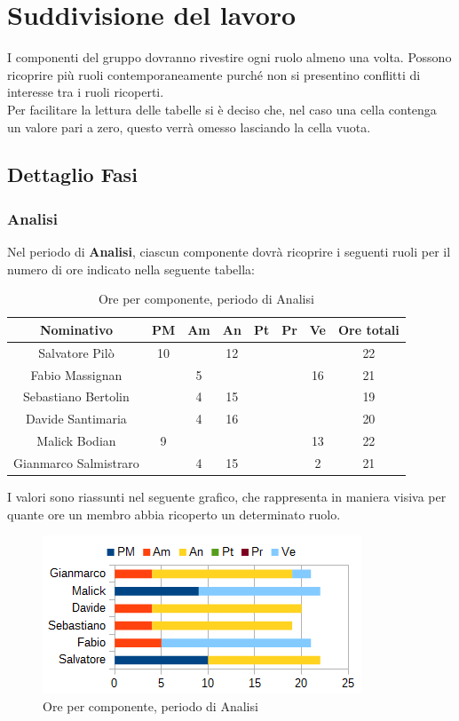 \section{Suddivisione del lavoro}
I componenti del gruppo dovranno rivestire ogni ruolo almeno una volta. Possono ricoprire più ruoli contemporaneamente purché non si presentino conflitti di interesse tra i ruoli ricoperti. \\
Per facilitare la lettura delle tabelle si è deciso che, nel caso una cella contenga un valore pari a zero, questo verrà omesso lasciando la cella vuota.
	\subsection{Dettaglio Fasi}
		\subsubsection{Analisi}
		Nel periodo di \textbf{Analisi}, ciascun componente dovrà ricoprire i seguenti ruoli per il numero di ore indicato nella seguente tabella: \\
		\begin{table}[H]
		\centering
		\begin{tabular}{|c|c|c|c|c|c|c|c|}
			\hline
			\textbf{Nominativo}		& \textbf{PM}	& \textbf{Am}	& \textbf{An}	& \textbf{Pt}	& \textbf{Pr}	& \textbf{Ve}	& \textbf{Ore totali}     \\
			\hline
			Salvatore Pilò			& 10	& 		& 12	&		&		&		& 22 \\
			Fabio Massignan			&		& 5		&		&		&		& 16	& 21 \\
			Sebastiano Bertolin		&		& 4		& 15	&		&		&		& 19 \\
			Davide Santimaria		&		& 4		& 16	&		&		&		& 20 \\
			Malick Bodian			& 9		&		&		&		&		& 13	& 22 \\
			Gianmarco Salmistraro	&		& 4		& 15	&		&		& 2		& 21 \\
			\hline
		\end{tabular}
		\caption{Ore per componente, periodo di Analisi}
		\end{table}
		I valori sono riassunti nel seguente grafico, che rappresenta in maniera visiva per quante ore un membro abbia ricoperto un determinato ruolo. \\
		\begin{figure}[H]
			\centering
			\includegraphics[width=1\linewidth]{immagini/grafici/analisi-barra.png}
			\caption{Ore per componente, periodo di Analisi}
		\end{figure}
